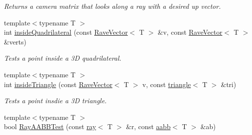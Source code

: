 \begin{DoxyCompactItemize}
\begin{DoxyCompactList}\small\item\em Returns a camera matrix that looks along a ray with a desired up vector. \item\end{DoxyCompactList}\item 
\hypertarget{group__geometric__primitives_ga3264b6e233d1bacaa2176bf9e7a74399}{
{\footnotesize template$<$typename T $>$ }\\int \hyperlink{group__geometric__primitives_ga3264b6e233d1bacaa2176bf9e7a74399}{insideQuadrilateral} (const \hyperlink{classOpenRAVE_1_1geometry_1_1RaveVector}{RaveVector}$<$ T $>$ \&v, const \hyperlink{classOpenRAVE_1_1geometry_1_1RaveVector}{RaveVector}$<$ T $>$ \&verts)}
\label{group__geometric__primitives_ga3264b6e233d1bacaa2176bf9e7a74399}

\begin{DoxyCompactList}\small\item\em Tests a point inside a 3D quadrilateral. \item\end{DoxyCompactList}\item 
\hypertarget{group__geometric__primitives_gafa7d69f62abeb6dcb2784b10ad6ef8a5}{
{\footnotesize template$<$typename T $>$ }\\int \hyperlink{group__geometric__primitives_gafa7d69f62abeb6dcb2784b10ad6ef8a5}{insideTriangle} (const \hyperlink{classOpenRAVE_1_1geometry_1_1RaveVector}{RaveVector}$<$ T $>$ v, const \hyperlink{classOpenRAVE_1_1geometry_1_1triangle}{triangle}$<$ T $>$ \&tri)}
\label{group__geometric__primitives_gafa7d69f62abeb6dcb2784b10ad6ef8a5}

\begin{DoxyCompactList}\small\item\em Tests a point insdie a 3D triangle. \item\end{DoxyCompactList}\item 
\hypertarget{group__geometric__primitives_ga1c4f9c919f34e3f44e4dbe3fd4abfb8e}{
{\footnotesize template$<$typename T $>$ }\\bool \hyperlink{group__geometric__primitives_ga1c4f9c919f34e3f44e4dbe3fd4abfb8e}{RayAABBTest} (const \hyperlink{classOpenRAVE_1_1geometry_1_1ray}{ray}$<$ T $>$ \&r, const \hyperlink{classOpenRAVE_1_1geometry_1_1aabb}{aabb}$<$ T $>$ \&ab)}
\label{group__geometric__primitives_ga1c4f9c919f34e3f44e4dbe3fd4abfb8e}


\end{DoxyCompactItemize}
